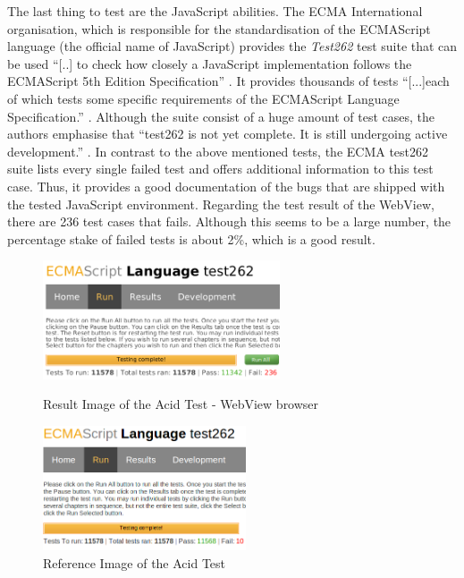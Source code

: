 The last thing to test are the JavaScript abilities.
The ECMA International organisation, which is responsible for the standardisation of the ECMAScript language (the official name of JavaScript) provides the \emph{Test262} test suite that can be used \enquote{[..] to check how closely a JavaScript implementation follows the ECMAScript 5th Edition Specification} \autocite{tech-ana:ECMAScript}.
It provides thousands of tests \enquote{[...]each of which tests some specific requirements of the ECMAScript Language Specification.} \autocite{tech-ana:ECMAtest}.
Although the suite consist of a huge amount of test cases, the authors emphasise that \enquote{test262 is not yet complete.
It is still undergoing active development.} \autocite{tech-ana:ECMAtest}.
In contrast to the above mentioned tests, the ECMA test262 suite lists every single failed test and offers additional information to this test case.
Thus, it provides a good documentation of the bugs that are shipped with the tested JavaScript environment.
Regarding the test result of the WebView, there are 236 test cases that fails.
Although this seems to be a large number, the percentage stake of failed tests is about 2\%, which is a good result.
   
\begin{figure}
\begin{minipage}[t]{7cm}
	\centering
	\includegraphics[width=7cm]{./img/tech-ana/ecma_result_webview_small.png}
	\caption{Result Image of the Acid Test - WebView browser}
	\label{fig:ecma_webview}
\end{minipage}
\hfill
\begin{minipage}[t]{6cm}
	\centering
	\includegraphics[width=6cm]{./img/tech-ana/ecma_result_chrome_small.png}
	\caption{Reference Image of the Acid Test}
	\label{fig:ecma_chrome}
\end{minipage}
\end{figure}



